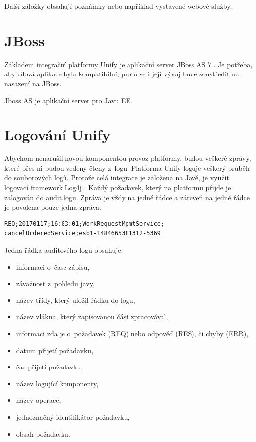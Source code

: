 \documentclass[thesis=M,czech]{FITthesis}[2012/10/20]
\begin{document}
			Další záložky obsahují poznámky nebo například vystavené webové služby.
			
			
		
	\section{JBoss}
		\label{sec:jboss}
		Základem integrační platformy Unify je aplikační server JBoss AS 7 \cite{unify}. Je potřeba, aby cílová aplikace byla kompatibilní, proto se i její vývoj bude soustředit na nasazení na JBoss.
		
		Jboss AS je aplikační server pro Javu EE\cite{jboss}.

					
	\section{Logování Unify}
		\label{sec:logging_unify}
		Abychom nenarušil novou komponentou provoz platformy, budou veškeré zprávy, které přes ni budou vedeny čteny z~logu. Platforma Unify loguje veškerý průběh do souborových logů. Protože celá integrace je založena na Javě, je využit logovací framework Log4j \cite{log4j}.
		Každý požadavek, který na platformu přijde je zalogován do audit.logu. Zpráva je vždy na jedné řádce a zároveň na jedné řádce je povolena pouze jedna zpráva.
		
		\begin{minipage}{\linewidth}
			\begin{lstlisting}[caption={Část řádky v~auditovém logu Unify}, label={lst:log}]
REQ;20170117;16:03:01;WorkRequestMgmtService;
cancelOrderedService;esb1-1484665381312-5369
			\end{lstlisting}
		\end{minipage}
		
		Jedna řádka auditového logu obsahuje:
		
		\begin{itemize} 
			\item informaci o~čase zápisu,
			\item závažnost z~pohledu javy, 
			\item název třídy, který uložil řádku do logu,
			\item název vlákna, který zapisovanou část zpracovával,
			\item informaci zda je o~požadavek (REQ) nebo odpověď (RES), či chyby (ERR),
			\item datum přijetí požadavku,
			\item čas přijetí požadavku,
			\item název logující komponenty,
			\item název operace,
			\item jednoznačný identifikátor požadavku,
			\item obsah požadavku.		
		\end{itemize}
		
\end{document}
